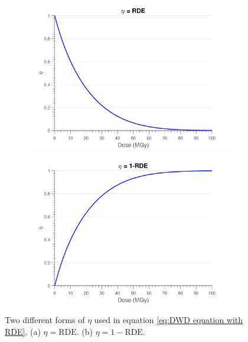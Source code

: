 \begin{figure}
        \centering
        \begin{subfigure}[b]{0.45\textwidth}
                \centering
                \includegraphics[width=\textwidth]{figures/dwd/EtaDecreasing.pdf}
                \caption{}
                \label{fig:Decreasing Eta}
        \end{subfigure}
			\quad
        \begin{subfigure}[b]{0.45\textwidth}
                \centering
                \includegraphics[width=\textwidth]{figures/dwd/EtaIncreasing.pdf}
                \caption{}
                \label{fig:Increasing Eta}
        \end{subfigure}
        \caption[Increasing and decreasing $\eta$ functions]{Two different forms of $\eta$ used in equation \ref{eq:DWD equation with RDE}. (a) $\eta = \text{RDE}$. (b) $\eta = 1-\text{RDE}$.}
        \label{fig:Different Eta forms}
\end{figure}

